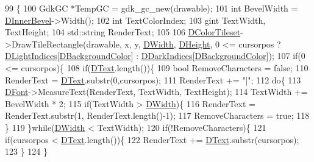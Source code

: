 \begin{DoxyCode}
99                                                                               \{
100     GdkGC *TempGC = gdk\_gc\_new(drawable);
101     \textcolor{keywordtype}{int} BevelWidth = \hyperlink{classCEditRenderer_a45b1bf4e9aebe3811c15df1018b8d8da}{DInnerBevel}->Width();
102     \textcolor{keywordtype}{int} TextColorIndex;
103     gint TextWidth, TextHeight;
104     std::string RenderText;
105     
106     \hyperlink{classCEditRenderer_a43dfa83f85527019c7499e33ecaed149}{DColorTileset}->DrawTileRectangle(drawable, x, y, \hyperlink{classCEditRenderer_ab203e5083f61d3575eb491f170c21d45}{DWidth}, 
      \hyperlink{classCEditRenderer_ade8dedb4f9790d28b38da8ef20a171cb}{DHeight}, 0 <= cursorpos ? \hyperlink{classCEditRenderer_aa1d5d41e26d759abd3ff5ba8edc4d692}{DLightIndices}[\hyperlink{classCEditRenderer_a7e5e1b18db4c53fe288c200aed673ccf}{DBackgroundColor}] : 
      \hyperlink{classCEditRenderer_a6bbd6668cec64e318d5e814423bac3ca}{DDarkIndices}[\hyperlink{classCEditRenderer_a7e5e1b18db4c53fe288c200aed673ccf}{DBackgroundColor}]);
107     \textcolor{keywordflow}{if}(0 <= cursorpos)\{
108         \textcolor{keywordflow}{if}(\hyperlink{classCEditRenderer_af79bf047383c610d4fc24d937e29c594}{DText}.length())\{
109             \textcolor{keywordtype}{bool} RemoveCharacters = \textcolor{keyword}{false};
110             RenderText = \hyperlink{classCEditRenderer_af79bf047383c610d4fc24d937e29c594}{DText}.substr(0,cursorpos);
111             RenderText += \textcolor{stringliteral}{"|"};
112             \textcolor{keywordflow}{do}\{
113                 \hyperlink{classCEditRenderer_afd108ae6cb3e9eeffce881a1ada0f0db}{DFont}->MeasureText(RenderText, TextWidth, TextHeight); 
114                 TextWidth += BevelWidth * 2;
115                 \textcolor{keywordflow}{if}(TextWidth > \hyperlink{classCEditRenderer_ab203e5083f61d3575eb491f170c21d45}{DWidth})\{
116                     RenderText = RenderText.substr(1, RenderText.length()-1);
117                     RemoveCharacters = \textcolor{keyword}{true};
118                 \}
119             \}\textcolor{keywordflow}{while}(\hyperlink{classCEditRenderer_ab203e5083f61d3575eb491f170c21d45}{DWidth} < TextWidth);
120             \textcolor{keywordflow}{if}(!RemoveCharacters)\{
121                 \textcolor{keywordflow}{if}(cursorpos < \hyperlink{classCEditRenderer_af79bf047383c610d4fc24d937e29c594}{DText}.length())\{
122                     RenderText += \hyperlink{classCEditRenderer_af79bf047383c610d4fc24d937e29c594}{DText}.substr(cursorpos);    
123                 \}
124             \}

\end{DoxyCode}
